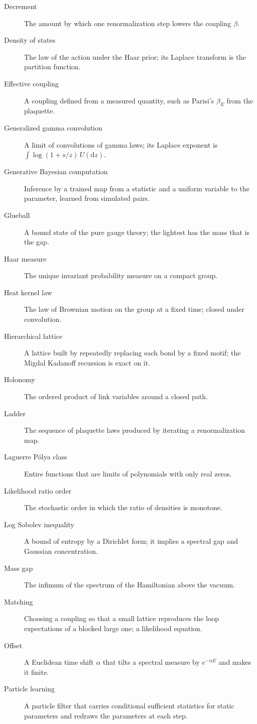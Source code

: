 \begin{description}
\item[Decrement] The amount by which one renormalization step lowers the coupling $\beta$.
\item[Density of states] The law of the action under the Haar prior; its Laplace transform is the partition function.
\item[Effective coupling] A coupling defined from a measured quantity, such as Parisi's $\beta_E$ from the plaquette.
\item[Generalized gamma convolution] A limit of convolutions of gamma laws; its Laplace exponent is $\int\log(1+s/z)\,U(\mathrm dz)$.
\item[Generative Bayesian computation] Inference by a trained map from a statistic and a uniform variable to the parameter, learned from simulated pairs.
\item[Glueball] A bound state of the pure gauge theory; the lightest has the mass that is the gap.
\item[Haar measure] The unique invariant probability measure on a compact group.
\item[Heat kernel law] The law of Brownian motion on the group at a fixed time; closed under convolution.
\item[Hierarchical lattice] A lattice built by repeatedly replacing each bond by a fixed motif; the Migdal Kadanoff recursion is exact on it.
\item[Holonomy] The ordered product of link variables around a closed path.
\item[Ladder] The sequence of plaquette laws produced by iterating a renormalization map.
\item[Laguerre P\'olya class] Entire functions that are limits of polynomials with only real zeros.
\item[Likelihood ratio order] The stochastic order in which the ratio of densities is monotone.
\item[Log Sobolev inequality] A bound of entropy by a Dirichlet form; it implies a spectral gap and Gaussian concentration.
\item[Mass gap] The infimum of the spectrum of the Hamiltonian above the vacuum.
\item[Matching] Choosing a coupling so that a small lattice reproduces the loop expectations of a blocked large one; a likelihood equation.
\item[Offset] A Euclidean time shift $\alpha$ that tilts a spectral measure by $e^{-\alpha E}$ and makes it finite.
\item[Particle learning] A particle filter that carries conditional sufficient statistics for static parameters and redraws the parameters at each step.

\end{description}

